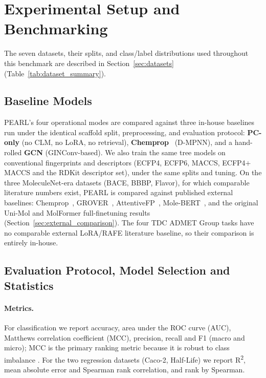 \documentclass[pdflatex,sn-mathphys-num,Numbered]{sn-jnl}%
\begin{document}
\section{Experimental Setup and Benchmarking}\label{sec:experimental_setup}
The seven datasets, their splits, and class/label distributions used throughout this benchmark are described in Section~\ref{sec:datasets} (Table~\ref{tab:dataset_summary}).

\subsection{Baseline Models}\label{sec:baselines}
PEARL's four operational modes are compared against three in-house baselines run under the identical scaffold split, preprocessing, and evaluation protocol: \textbf{PC-only} (no CLM, no LoRA, no retrieval), \textbf{Chemprop}~\cite{yang2019chemprop} (D-MPNN), and a hand-rolled \textbf{GCN} (GINConv-based). We also train the same tree models on conventional fingerprints and descriptors (ECFP4, ECFP6, MACCS, ECFP4$+$MACCS and the RDKit descriptor set), under the same splits and tuning. On the three MoleculeNet-era datasets (BACE, BBBP, Flavor), for which comparable literature numbers exist, PEARL is compared against published external baselines: Chemprop~\cite{yang2019chemprop}, GROVER~\cite{rong2020grover}, AttentiveFP~\cite{xiong2020attentivefp}, Mole-BERT~\cite{xia2023molecbert}, and the original Uni-Mol and MolFormer full-finetuning results (Section~\ref{sec:external_comparison}). The four TDC ADMET Group tasks have no comparable external LoRA/RAFE literature baseline, so their comparison is entirely in-house.

\subsection{Evaluation Protocol, Model Selection and Statistics}\label{sec:eval_protocol}
\paragraph{Metrics.} For classification we report accuracy, area under the ROC curve (AUC), Matthews correlation coefficient (MCC), precision, recall and F1 (macro and micro); MCC is the primary ranking metric because it is robust to class imbalance \cite{mall2024vishpred,mall2013furs,mall2014representative}. For the two regression datasets (Caco-2, Half-Life) we report R\textsuperscript{2}, mean absolute error and Spearman rank correlation, and rank by Spearman.
\end{document}
